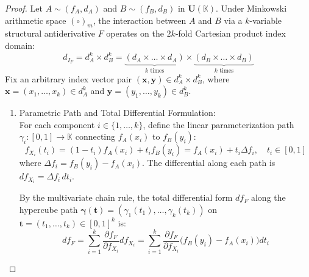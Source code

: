 \documentclass[a4paper,12pt, twoside]{memoir}
\begin{document}
\begin{proof}
	Let $A \sim (f_A, d_A)$ and $B \sim (f_B, d_B)$ in $\mathbf{U}(\mathbb{K})$. Under Minkowski arithmetic space $(\circ)_m$, the interaction between $A$ and $B$ via a $k$-variable structural antiderivative $F$ operates on the $2k$-fold Cartesian product index domain:
	\[
		d_{I_F} = d_A^k \times d_B^k = \underbrace{(d_A \times \dots \times d_A)}_{k \text{ times}} \times \underbrace{(d_B \times \dots \times d_B)}_{k \text{ times}}
	\]
	Fix an arbitrary index vector pair $(\mathbf{x}, \mathbf{y}) \in d_A^k \times d_B^k$, where $\mathbf{x} = (x_1, \dots, x_k) \in d_A^k$ and $\mathbf{y} = (y_1, \dots, y_k) \in d_B^k$.

	\begin{enumerate}[leftmargin=*]
		\item Parametric Path and Total Differential Formulation: \\
		      For each component $i \in \{1, \dots, k\}$, define the linear parameterization path $\gamma_i : [0, 1] \to \mathbb{K}$ connecting $f_A(x_i)$ to $f_B(y_i)$:
		      \[
			      f_{X_i}(t_i) = (1 - t_i) f_A(x_i) + t_i f_B(y_i) = f_A(x_i) + t_i \Delta f_i, \quad t_i \in [0, 1]
		      \]
		      where $\Delta f_i = f_B(y_i) - f_A(x_i)$. The differential along each path is $d f_{X_i} = \Delta f_i \, dt_i$.

		      By the multivariate chain rule, the total differential form $df_F$ along the hypercube path $\boldsymbol{\gamma}(\mathbf{t}) = (\gamma_1(t_1), \dots, \gamma_k(t_k))$ on $\mathbf{t} = (t_1, \dots, t_k) \in [0, 1]^k$ is:
		      \[
			      d f_F = \sum_{i=1}^{k} \frac{\partial f_F}{\partial f_{X_i}} d f_{X_i} = \sum_{i=1}^{k} \frac{\partial f_F}{\partial f_{X_i}} \big(f_B(y_i) - f_A(x_i)\big) dt_i
		      \]


\end{enumerate}
\end{proof}
\end{document}
